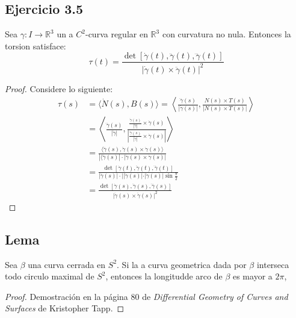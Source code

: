 \documentclass[12pt]{article}
\begin{document}
\subsection*{Ejercicio 3.5}
Sea $\gamma : I \rightarrow \mathbb{R}^3$ un a $C^2$-curva regular en $\mathbb{R}^3$ con curvatura no nula. Entonces la torsion satisface:
\begin{equation*}
\tau (t)=\frac{\det [\dot{\gamma}(t), \ddot{\gamma}(t),\dddot{\gamma}(t)]}{|\dot{\gamma}(t) \times \ddot{\gamma}(t)|^2 }
\end{equation*}
\begin{proof}
Considere lo siguiente:
\begin{equation*}
  \begin{split}
    \tau(s)&=\langle \dot{N}(s), B(s) \rangle = \left\langle\frac{\dddot{\gamma}(s)}{|\ddot{\gamma}(s)|}, \frac{N(s)\times T(s)}{|N(s)\times T(s)|}\right\rangle \\
     &=\left\langle \frac{\dddot{\gamma}(s)}{|\ddot{\gamma}|}, \frac{\frac{\ddot{\gamma}(s)}{|\ddot{\gamma}|}\times \dot{\gamma}(s)}{|\frac{\ddot{\gamma}(s)}{|\ddot{\gamma}|}\times \dot{\gamma}(s)|}\right\rangle \\
     &=\frac{\langle \dddot{\gamma}(s), \ddot{\gamma}(s)\times \dot{\gamma}(s)\rangle}{|\langle \dddot{\gamma}(s)| \cdot |\ddot{\gamma}(s)\times \dot{\gamma}(s)|} \\
     &=\frac{\det [\dot{\gamma}(t), \ddot{\gamma}(t),\dddot{\gamma}(t)]}{|\dddot{\gamma}(s)|\cdot||\ddot{\gamma}(s)|\cdot |\dot{\gamma}(s)| \sin \frac{\pi}{2}}\\
     &=\frac{\det [\dot{\gamma}(s), \ddot{\gamma}(s),\dddot{\gamma}(s)]}{|\dot{\gamma}(s) \times \ddot{\gamma}(s)|^2 }
  \end{split}
\end{equation*}



\end{proof}
\subsection*{Lema}
Sea $\beta$ una curva cerrada en $S^2$. Si la a curva geometrica dada por $\beta$ interseca todo circulo maximal de $S^2$, entonces la longitudde arco de $\beta$ es mayor a $2\pi$,

\begin{proof}
  Demostraci\'on en la p\'agina 80  de   \textit{Differential Geometry of Curves and Surfaces} de Kristopher Tapp.
\end{proof}
\end{document}

